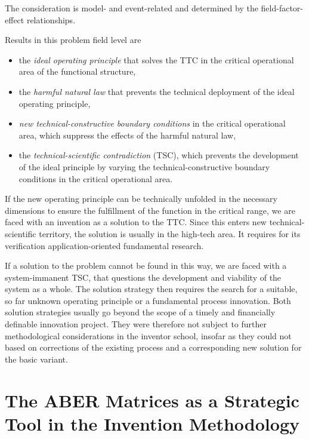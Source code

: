 \documentclass[11pt,a4paper]{article}
\begin{document}
The consideration is model- and event-related and determined by the
field-factor-effect relationships.

Results in this problem field level are
\begin{itemize}
\item the \emph{ideal operating principle} that solves the TTC in the critical
  operational area of the functional structure,
\item the \emph{harmful natural law} that prevents the technical deployment of
  the ideal operating principle,
\item \emph{new technical-constructive boundary conditions} in the critical
  operational area, which suppress the effects of the harmful natural law,
\item the \emph{technical-scientific contradiction} (TSC), which prevents the
  development of the ideal principle by varying the technical-constructive
  boundary conditions in the critical operational area.
\end{itemize}
If the new operating principle can be technically unfolded in the necessary
dimensions to ensure the fulfillment of the function in the critical range, we
are faced with an invention as a solution to the TTC.  Since this enters new
technical-scientific territory, the solution is usually in the high-tech
area. It requires for its verification application-oriented fundamental
research.

If a solution to the problem cannot be found in this way, we are faced with a
system-immanent TSC, that questions the development and viability of the
system as a whole. The solution strategy then requires the search for a
suitable, so far unknown operating principle or a fundamental process
innovation. Both solution strategies usually go beyond the scope of a timely
and financially definable innovation project. They were therefore not subject
to further methodological considerations in the inventor school, insofar as
they could not based on corrections of the existing process and a
corresponding new solution for the basic variant.

\section{The ABER Matrices as a Strategic Tool in the Invention Methodology}
\end{document}
